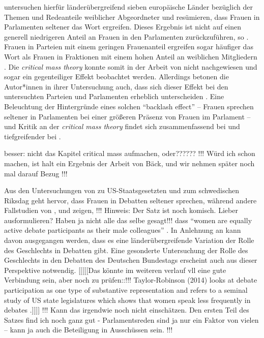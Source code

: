 \documentclass[12pt, 
    twoside=false, 
    bibliography=totoc, 
    numbers=endperiod, 
    headings=normal, 
    toc=chapterentrydotfill
    ]{scrbook}
\begin{document}
\textcite{back_2018} untersuchen hierfür länderübergreifend sieben europäische Länder bezüglich der Themen und Redeanteile weiblicher Abgeordneter und resümieren, dass Frauen in Parlamenten seltener das Wort ergreifen. Dieses Ergebnis ist nicht auf einen generell niedrigeren Anteil an Frauen in den Parlamenten zurückzuführen, so \textcite{back_2018}. Frauen in Parteien mit einem geringen Frauenanteil ergreifen sogar häufiger das Wort als Frauen in Fraktionen mit einem hohen Anteil an weiblichen Mitgliedern \parencite*[17]{back_2018}. Die \emph{critical mass theory} konnte somit in der Arbeit von \textcite{back_2018} nicht nachgewiesen und sogar ein gegenteiliger Effekt beobachtet werden. Allerdings betonen die Autor*innen in ihrer Untersuchung auch, dass sich dieser Effekt bei den untersuchten Parteien und Parlamenten erheblich unterscheiden \parencite[17]{back_2018}. Eine Beleuchtung der Hintergründe eines solchen \enquote{backlash effect} -- Frauen sprechen seltener in Parlamenten bei einer größeren Präsenz von Frauen im Parlament -- und Kritik an der \emph{critical mass theory} findet sich zusammenfassend bei \textcite[4]{back_2018} und tiefgreifender bei \textcite{childs_2008}.

besser: nicht das Kapitel critical mass aufmachen, oder?????? !!! Würd ich schon machen, ist halt ein Ergebnis der Arbeit von Bäck, und wir nehmen später noch mal darauf Bezug !!!

Aus den Untersuchungen von \textcite{kathlene_1994} zu US-Staatsgesetzten und \textcite{back_2014} zum schwedischen Riksdag geht hervor, dass Frauen in Debatten seltener sprechen, während andere Fallstudien von \textcite{broughton_1999}, \textcite{murray_2010} und \textcite{wang_2014} zeigen, !!! Hinweis: Der Satz ist noch komisch. Lieber ausformulieren? Haben ja nicht alle das selbe gesagt!!! dass \enquote{women are equally active debate participants as their male colleagues} \parencites[254]{taylor-robinson_2014}[2]{back_2018}. In Anlehnung an \textcite{back_2018} kann davon ausgegangen werden, dass es eine länderübergreifende Variation der Rolle des Geschlechts in Debatten gibt\parencite[2]{back_2018}. Eine gesonderte Untersuchung der Rolle des Geschlechts in den Debatten des Deutschen Bundestags erscheint auch aus dieser Perspektive notwendig. 
[[[[[Das könnte im weiteren verlauf vll eine gute Verbindung sein, aber noch zu prüfen::!!! Taylor-Robinson (2014) looks at debate participation as one type of substantive representation and refers to a seminal study of US state legislatures which shows that women speak less frequently in debates \parencite{kathlene_1994}.]]]] !!! Kann das irgendwie noch nicht einschätzen. Den ersten Teil des Satzes find ich noch ganz gut - Parlamentsreden sind ja nur ein Faktor von vielen -- kann ja auch die Beteiligung in Ausschüssen sein. !!!
\end{document}
